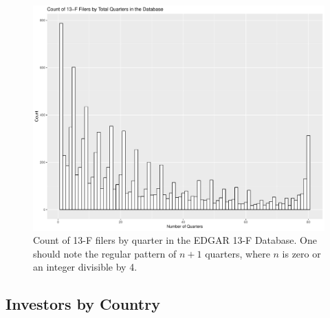 \begin{figure}
	\centering
	\includegraphics[width=1\linewidth]{Figures/ChapterIII/Count_of_Filers}
	\caption[Count of 13-F Filers by Quarter]{Count of 13-F filers by quarter in the EDGAR 13-F Database. One should note the regular pattern of $n+1$ quarters, where $n$ is zero or an integer divisible by 4.}
	\label{fig:countoffilers}
\end{figure}



\subsection{Investors by Country}


